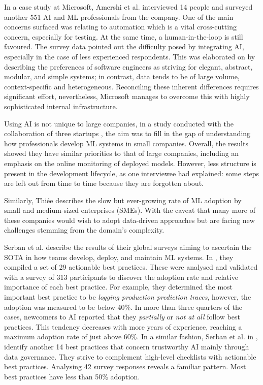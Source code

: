 In a case study at Microsoft, Amershi et al. \cite{amershi2019software} interviewed 14 people and surveyed another 551 AI and ML professionals from the company. One of the main concerns surfaced was relating to automation which is a vital cross-cutting concern, especially for testing. At the same time, a human-in-the-loop is still favoured. The survey data pointed out the difficulty posed by integrating AI, especially in the case of less experienced respondents. This was elaborated on by describing the preferences of software engineers as striving for elegant, abstract, modular, and simple systems; in contrast, data tends to be of large volume, context-specific and heterogeneous. Reconciling these inherent differences requires significant effort, nevertheless, Microsoft manages to overcome this with highly sophisticated internal infrastructure.

Using AI is not unique to large companies, in a study conducted with the collaboration of three startups \cite{de2019understanding}, the aim was to fill in the gap of understanding how professionals develop ML systems in small companies. Overall, the results showed they have similar priorities to that of large companies, including an emphasis on the online monitoring of deployed models. However, less structure is present in the development lifecycle, as one interviewee had explained: some steps are left out from time to time because they are forgotten about.

Similarly, Thiée \cite{thiee2021systematic} describes the slow but ever-growing rate of ML adoption by small and medium-sized enterprises (SMEs). With the caveat that many more of these companies would wish to adopt data-driven approaches but are facing new challenges stemming from the domain's complexity.

Serban et al. \cite{serban2020adoption,serban2021practices} describe the results of their global surveys aiming to ascertain the SOTA in how teams develop, deploy, and maintain ML systems. In \cite{serban2020adoption}, they compiled a set of 29 actionable best practices. These were analysed and validated with a survey of 313 participants to discover the adoption rate and relative importance of each best practice. For example, they determined the most important best practice to be \textit{logging production prediction traces}, however, the adoption was measured to be below 40\%. In more than three quarters of the cases, newcomers to AI reported that they \textit{partially} or \textit{not at all} follow best practices. This tendency decreases with more years of experience, reaching a maximum adoption rate of just above 60\%. In a similar fashion, Serban et al. in \cite{serban2021practices}, identify another 14 best practices that concern trustworthy AI mainly through data governance. They strive to complement high-level checklists with actionable best practices. Analysing 42 survey responses reveals a familiar pattern. Most best practices have less than 50\% adoption.


